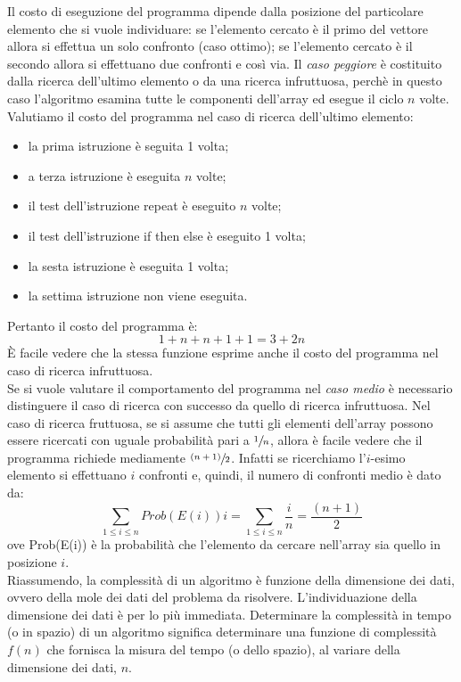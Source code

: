 \documentclass[12pt]{report}
\begin{document}
   	Il costo di eseguzione del programma dipende dalla posizione del particolare elemento che si vuole individuare: se l'elemento cercato è il primo del vettore allora si effettua un solo confronto (caso ottimo); se l'elemento cercato è il secondo allora si effettuano due confronti e così via. Il \textit{caso peggiore} è costituito dalla ricerca dell'ultimo elemento o da una ricerca infruttuosa, perchè in questo caso l'algoritmo esamina tutte le componenti dell'array ed esegue il ciclo $n$ volte. \\
   	Valutiamo il costo del programma nel caso di ricerca dell'ultimo elemento:
   	\begin{itemize}
   		\item la prima istruzione è seguita 1 volta;
   		\item a terza istruzione è eseguita $n$ volte;
   		\item il test dell'istruzione repeat è eseguito $n$ volte;
   		\item il test dell'istruzione if then else è eseguito 1 volta;
   		\item la sesta istruzione è eseguita 1 volta;
   		\item la settima istruzione non viene eseguita.
   	\end{itemize}
   	Pertanto il costo del programma è:
   	\[
   	1 + n + n + 1 + 1 = 3 + 2n
   	\]
   	È facile vedere che la stessa funzione esprime anche il costo del programma nel caso di ricerca infruttuosa. \\
   	Se si vuole valutare il comportamento del programma nel \textit{caso medio} è necessario distinguere il caso di ricerca con successo da quello di ricerca infruttuosa. Nel caso di ricerca fruttuosa, se si assume che tutti gli elementi dell'array possono essere ricercati con uguale probabilità pari a $\sfrac{1}{n}$, allora è facile vedere che il programma richiede mediamente $\sfrac{(n + 1)}{2}$. Infatti se ricerchiamo l'$i$-esimo elemento si effettuano $i$ confronti e, quindi, il numero di confronti medio è dato da:
   	\[
   	\sum_{1 \leq i \leq n}Prob(E(i))i = \sum_{1 \leq i \leq n}\frac{i}{n} = \frac{(n + 1)}{2}
   	\]
   	ove Prob(E(i)) è la probabilità che l'elemento da cercare nell'array sia quello in posizione $i$. \\
   	Riassumendo, la complessità di un algoritmo è funzione della dimensione dei dati, ovvero della mole dei dati del problema da risolvere. L'individuazione della dimensione dei dati è per lo più immediata. Determinare la complessità in tempo (o in spazio) di un algoritmo significa determinare una funzione di complessità $f(n)$ che fornisca la misura del tempo (o dello spazio), al variare della dimensione dei dati, $n$. \\
\end{document}
